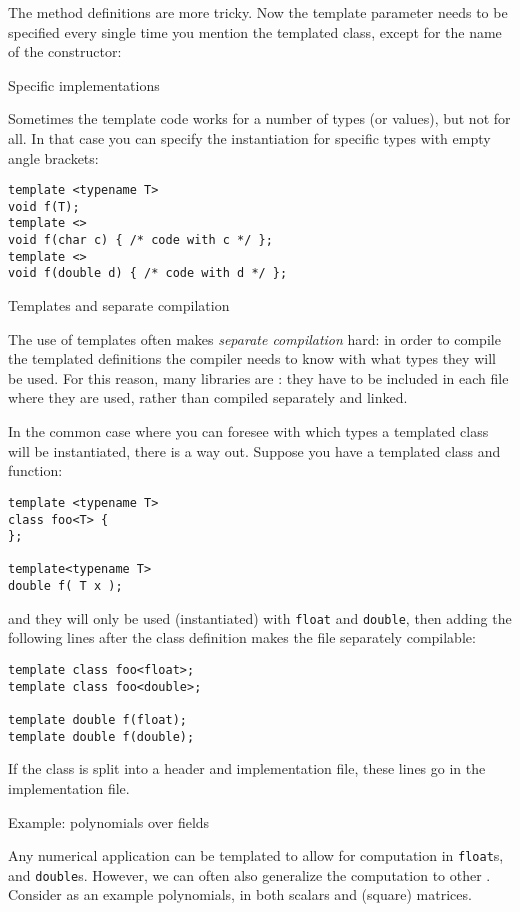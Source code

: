 The method definitions are more tricky.
Now the template parameter needs to be specified every single time
you mention the templated class,
except for the name of the constructor:
%

 {Specific implementations}

Sometimes the template code works for a number of types (or values),
but not for all. In that case you can specify the instantiation for
specific types with empty angle brackets:
\begin{lstlisting}
template <typename T>
void f(T);
template <> 
void f(char c) { /* code with c */ };
template <>
void f(double d) { /* code with d */ };
\end{lstlisting}

 {Templates and separate compilation}
\label{sec:templ-header}

The use of templates often makes
\emph{separate compilation}
hard: in order to compile the
templated definitions the compiler needs to know with what types they
will be used.
For this reason, many libraries are :
they have to be included in each file where they are used,
rather than compiled separately and linked.

In the common case where you can foresee with which types
a templated class will be instantiated, there is a way out.
Suppose you have a templated class and function:
\begin{lstlisting}
template <typename T>
class foo<T> {
};

template<typename T>
double f( T x );
\end{lstlisting}
and they will only be used (instantiated) with \lstinline{float} and
\lstinline{double}, then adding the following lines after the class definition
makes the file separately compilable:
\begin{lstlisting}
template class foo<float>;
template class foo<double>;

template double f(float);
template double f(double);
\end{lstlisting}

If the class is split into a header and implementation file,
these lines go in the implementation file.

 {Example: polynomials over fields}
\label{sec:poly-template}

Any numerical application can be templated to
allow for computation in
 \lstinline{float}s,
and
 \lstinline{double}s.
However, we can often also generalize the computation
to other .
Consider as an example polynomials,
in both scalars and (square) matrices.

